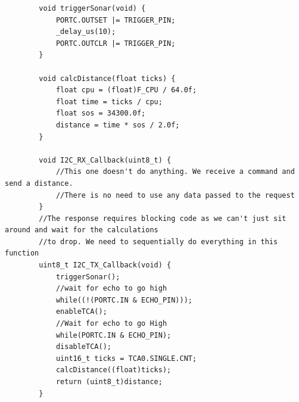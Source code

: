 \documentclass[11pt,a4paper,titlepage]{report}
\begin{document}
\begin{lstlisting}
		void triggerSonar(void) {
			PORTC.OUTSET |= TRIGGER_PIN;
			_delay_us(10);
			PORTC.OUTCLR |= TRIGGER_PIN;
		}
		
		void calcDistance(float ticks) {
			float cpu = (float)F_CPU / 64.0f;
			float time = ticks / cpu;
			float sos = 34300.0f;
			distance = time * sos / 2.0f;
		}
		
		void I2C_RX_Callback(uint8_t) {
			//This one doesn't do anything. We receive a command and send a distance. 
			//There is no need to use any data passed to the request
		}
		//The response requires blocking code as we can't just sit around and wait for the calculations 
		//to drop. We need to sequentially do everything in this function
		uint8_t I2C_TX_Callback(void) {
			triggerSonar();
			//wait for echo to go high
			while((!(PORTC.IN & ECHO_PIN)));
			enableTCA();
			//Wait for echo to go High
			while(PORTC.IN & ECHO_PIN);
			disableTCA();
			uint16_t ticks = TCA0.SINGLE.CNT;
			calcDistance((float)ticks);
			return (uint8_t)distance;
		}
	\end{lstlisting}
	
\end{document}
